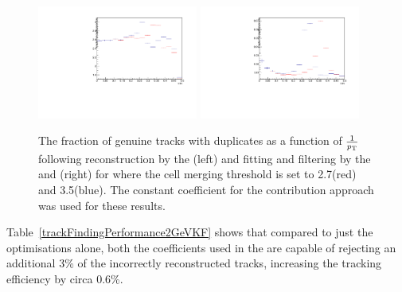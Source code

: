 \begin{figure}[tbp]
\centering
\includegraphics[width=0.47\textwidth]{figs/tk-upgrade/results-lowPtTracking/htFracDuplicatesVsInvPtTiltedGeometry_5000.pdf}
\includegraphics[width=0.47\textwidth]{figs/tk-upgrade/results-lowPtTracking/kfFracDuplicatesVsInvPtTiltedGeometry_5000.pdf}
\caption{The fraction of genuine tracks with duplicates as a function of $\frac{1}{p_{\mathrm{T}}}$ following reconstruction by the \HT (left) and fitting and filtering by the \KF and \DR (right) for where the \HT cell merging \pT threshold is set to 2.7\GeV (red) and 3.5\GeV (blue). 
The constant coefficient for the \MS contribution approach was used for these \KF results.
}
\label{fig:2GeVfracDups}
\end{figure}

Table~\ref{trackFindingPerformance2GeVKF} shows that compared to just the \HT optimisations alone, both the \MS coefficients used in the \KF are capable of rejecting an additional 3\% of the incorrectly reconstructed tracks, increasing the tracking efficiency by circa 0.6\%.


